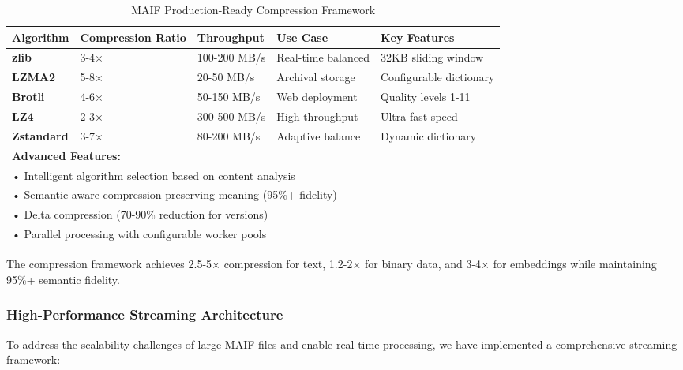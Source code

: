\documentclass[conference]{IEEEtran}
\begin{document}
\begin{table*}[!t]
\renewcommand{\arraystretch}{1.3}
\caption{MAIF Production-Ready Compression Framework}
\label{tab:compression-framework}
\centering
\footnotesize
\begin{tabular}{p{2.5cm}p{3cm}p{2.5cm}p{2.5cm}p{3cm}}
\toprule
\textbf{Algorithm} & \textbf{Compression Ratio} & \textbf{Throughput} & \textbf{Use Case} & \textbf{Key Features} \\
\midrule
\textbf{zlib} & 3-4× & 100-200 MB/s & Real-time balanced & 32KB sliding window \\
\textbf{LZMA2} & 5-8× & 20-50 MB/s & Archival storage & Configurable dictionary \\
\textbf{Brotli} & 4-6× & 50-150 MB/s & Web deployment & Quality levels 1-11 \\
\textbf{LZ4} & 2-3× & 300-500 MB/s & High-throughput & Ultra-fast speed \\
\textbf{Zstandard} & 3-7× & 80-200 MB/s & Adaptive balance & Dynamic dictionary \\
\midrule
\multicolumn{5}{l}{\textbf{Advanced Features:}} \\
\multicolumn{5}{l}{• Intelligent algorithm selection based on content analysis} \\
\multicolumn{5}{l}{• Semantic-aware compression preserving meaning (95\%+ fidelity)} \\
\multicolumn{5}{l}{• Delta compression (70-90\% reduction for versions)} \\
\multicolumn{5}{l}{• Parallel processing with configurable worker pools} \\
\bottomrule
\end{tabular}
\end{table*}

The compression framework achieves 2.5-5× compression for text, 1.2-2× for binary data, and 3-4× for embeddings while maintaining 95\%+ semantic fidelity.

\subsubsection{High-Performance Streaming Architecture}

To address the scalability challenges of large MAIF files and enable real-time processing, we have implemented a comprehensive streaming framework:
\end{document}
